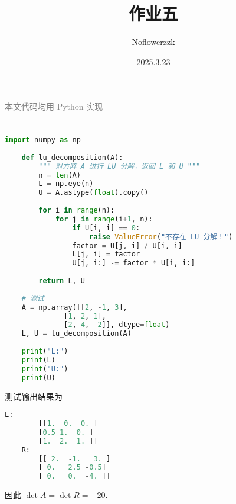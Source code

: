 \documentclass{article}
\title{作业五}
\author{Noflowerzzk}
\date{2025.3.23}
\begin{document}
\maketitle

\textcolor{gray}{本文代码均用 Python 实现}

\section{}

\begin{lstlisting}[style=codestyle, language=Python, title=LU 分解代码]
    import numpy as np
    
    def lu_decomposition(A):
        """ 对方阵 A 进行 LU 分解，返回 L 和 U """
        n = len(A)
        L = np.eye(n)
        U = A.astype(float).copy()
        
        for i in range(n):
            for j in range(i+1, n):
                if U[i, i] == 0:
                    raise ValueError("不存在 LU 分解！")
                factor = U[j, i] / U[i, i]
                L[j, i] = factor
                U[j, i:] -= factor * U[i, i:]
                
        return L, U
    
    # 测试
    A = np.array([[2, -1, 3],
              [1, 2, 1],
              [2, 4, -2]], dtype=float)
    L, U = lu_decomposition(A)
    
    print("L:")
    print(L)
    print("U:")
    print(U)
\end{lstlisting}

测试输出结果为

\begin{lstlisting}[style=codestyle, language=Python,title=输出结果]
    L:
        [[1.  0.  0. ]
        [0.5 1.  0. ]
        [1.  2.  1. ]]
    R:
        [[ 2.  -1.   3. ]
        [ 0.   2.5 -0.5]
        [ 0.   0.  -4. ]]
\end{lstlisting}

因此 $\det A = \det R = -20$.

\section{}
\end{document}
